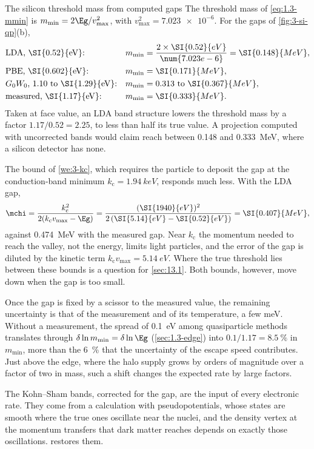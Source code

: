 \begin{workedexample}{The silicon threshold mass from computed gaps}\label{we:3-mmin-gap}
The threshold mass of \cref{eq:1.3-mmin} is $m_{\mathrm{min}} = 2\Eg/v_{\mathrm{max}}^2$, with $v_{\mathrm{max}}^2 = \num{7.023e-6}$. For the gaps of \cref{fig:3-si-qp}(b),
\begin{equation*}
  \begin{aligned}
  &\text{LDA, \SI{0.52}{eV}:} & m_{\mathrm{min}} &= \frac{2\times\SI{0.52}{eV}}{\num{7.023e-6}} = \SI{0.148}{MeV}, \\
  &\text{PBE, \SI{0.602}{eV}:} & m_{\mathrm{min}} &= \SI{0.171}{MeV}, \\
  &\text{$G_0W_0$, 1.10 to \SI{1.29}{eV}:} & m_{\mathrm{min}} &= 0.313 \text{ to } \SI{0.367}{MeV}, \\
  &\text{measured, \SI{1.17}{eV}:} & m_{\mathrm{min}} &= \SI{0.333}{MeV}.
  \end{aligned}
\end{equation*}
Taken at face value, an LDA band structure lowers the threshold mass by a factor $1.17/0.52 = 2.25$, to less than half its true value. A projection computed with uncorrected bands would claim reach between 0.148 and \SI{0.333}{MeV}, where a silicon detector has none.

The bound of \cref{we:3-kc}, which requires the particle to deposit the gap at the conduction-band minimum $k_{\mathrm{c}} = \SI{1.94}{keV}$, responds much less. With the LDA gap,
\begin{equation*}
  \mchi = \frac{k_{\mathrm{c}}^2}{2(k_{\mathrm{c}}v_{\mathrm{max}} - \Eg)} = \frac{(\SI{1940}{eV})^2}{2\,(\SI{5.14}{eV} - \SI{0.52}{eV})} = \SI{0.407}{MeV},
\end{equation*}
against \SI{0.474}{MeV} with the measured gap. Near $k_{\mathrm{c}}$ the momentum needed to reach the valley, not the energy, limits light particles, and the error of the gap is diluted by the kinetic term $k_{\mathrm{c}}v_{\mathrm{max}} = \SI{5.14}{eV}$. Where the true threshold lies between these bounds is a question for \cref{sec:13.1}. Both bounds, however, move down when the gap is too small.

Once the gap is fixed by a scissor to the measured value, the remaining uncertainty is that of the measurement and of its temperature, a few meV. Without a measurement, the spread of \SI{0.1}{eV} among quasiparticle methods translates through $\delta\ln m_{\mathrm{min}} = \delta\ln\Eg$ (\cref{sec:1.3-edge}) into $0.1/1.17 = \SI{8.5}{\percent}$ in $m_{\mathrm{min}}$, more than the \SI{6}{\percent} that the uncertainty of the escape speed contributes. Just above the edge, where the halo supply grows by orders of magnitude over a factor of two in mass, such a shift changes the expected rate by large factors.
\end{workedexample}

The Kohn--Sham bands, corrected for the gap, are the input of every electronic rate. They come from a calculation with pseudopotentials, whose states are smooth where the true ones oscillate near the nuclei, and the density vertex at the momentum transfers that dark matter reaches depends on exactly those oscillations.  restores them.
